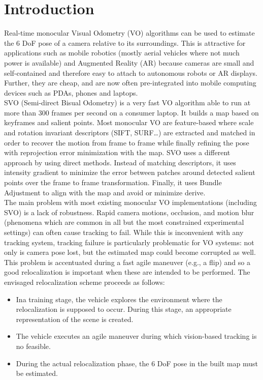 \chapter{Introduction}\label{sec:introduction}

Real-time monocular Visual Odometry (VO) algorithms can be used to estimate the 6 DoF pose of a camera relative to its surroundings. This is attractive for applications such as mobile robotics (mostly aerial vehicles where not much power is available) and Augmented Reality (AR) because cameras are small and self-contained and therefore easy to attach to autonomous robots or AR displays. Further, they are cheap, and are now often pre-integrated into mobile computing devices such as PDAs, phones and laptops.\\

SVO (Semi-direct Bisual Odometry) \cite{Forster2014} is a very fast VO algorithm able to run at more than 300 frames per second on a consumer laptop. It builds a map based on keyframes and salient points. Most monocular VO are feature-based where scale and rotation invariant descriptors (SIFT, SURF\ldots) are extracted and matched in order to recover the motion from frame to frame while finally refining the pose with reprojection error minimization with the map. SVO uses a different approach by using direct methods. Instead of matching descriptors, it uses intensity gradient to minimize the error between patches around detected salient points over the frame to frame transformation. Finally, it uses Bundle Adjustment to align with the map and avoid or minimize derive.\\

The main problem with most existing monocular VO implementations (including SVO) is a lack of robustness. Rapid camera motions, occlusion, and motion blur (phenomena which are common in all but the most constrained experimental settings) can often cause tracking to fail. While this is inconvenient with any tracking system, tracking failure is particularly problematic for VO systems: not only is camera pose lost, but the estimated map could become corrupted as well. \\

This problem is accentuated during a fast  agile maneuver (e.g., a flip) and so a good relocalization is important when these are intended to be performed. The envisaged relocalization scheme proceeds as follows:

\begin{itemize}
  \item Ina training stage, the vehicle explores the environment where the relocalization is supposed to occur. During this stage, an appropriate representation of the scene is created. 
  \item The vehicle executes an agile maneuver during which vision-based tracking is no feasible.
  \item During the actual relocalization phase, the 6 DoF pose in  the built map must be estimated.
\end{itemize}

